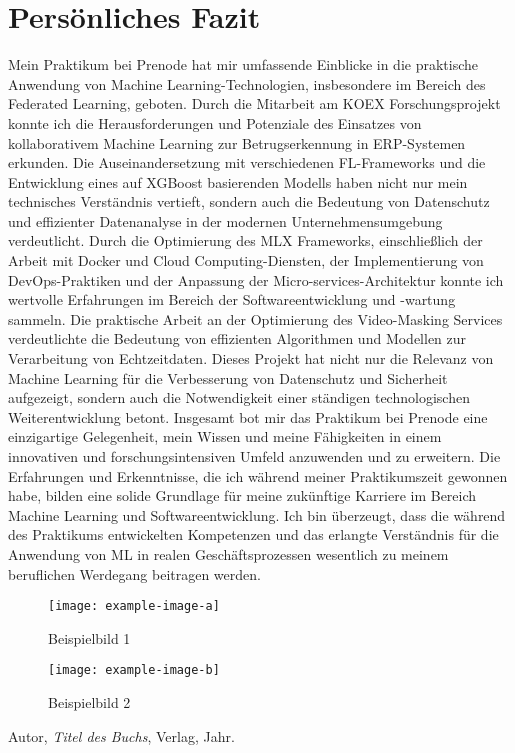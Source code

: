 \documentclass[11pt]{article}
\begin{document}
\section{Persönliches Fazit}
Mein Praktikum bei Prenode hat mir umfassende Einblicke in die praktische Anwendung von Machine Learning-Technologien, insbesondere im Bereich des Federated Learning, geboten. Durch die Mitarbeit am KOEX Forschungsprojekt konnte ich die Herausforderungen und Potenziale des Einsatzes von kollaborativem Machine Learning zur Betrugserkennung in ERP-Systemen erkunden. Die Auseinandersetzung mit verschiedenen FL-Frameworks und die Entwicklung eines auf XGBoost basierenden Modells haben nicht nur mein technisches Verständnis vertieft, sondern auch die Bedeutung von Datenschutz und effizienter Datenanalyse in der modernen Unternehmensumgebung verdeutlicht.
\newline
Durch die Optimierung des MLX Frameworks, einschließlich der Arbeit mit Docker und Cloud Computing-Diensten, der Implementierung von DevOps-Praktiken und der Anpassung der Micro-services-Architektur konnte ich wertvolle Erfahrungen im Bereich der Softwareentwicklung und -wartung sammeln. Die praktische Arbeit an der Optimierung des Video-Masking Services verdeutlichte die Bedeutung von effizienten Algorithmen und Modellen zur Verarbeitung von Echtzeitdaten. Dieses Projekt hat nicht nur die Relevanz von Machine Learning für die Verbesserung von Datenschutz und Sicherheit aufgezeigt, sondern auch die Notwendigkeit einer ständigen technologischen Weiterentwicklung betont.
Insgesamt bot mir das Praktikum bei Prenode eine einzigartige Gelegenheit, mein Wissen und meine Fähigkeiten in einem innovativen und forschungsintensiven Umfeld anzuwenden und zu erweitern. Die Erfahrungen und Erkenntnisse, die ich während meiner Praktikumszeit gewonnen habe, bilden eine solide Grundlage für meine zukünftige Karriere im Bereich Machine Learning und Softwareentwicklung. Ich bin überzeugt, dass die während des Praktikums entwickelten Kompetenzen und das erlangte Verständnis für die Anwendung von ML in realen Geschäftsprozessen wesentlich zu meinem beruflichen Werdegang beitragen werden.


\listoffigures
\newpage

\begin{figure}[h]
\centering
\texttt{[image: example-image-a]}
\caption{Beispielbild 1}
\end{figure}


\begin{figure}[h]
\centering
\texttt{[image: example-image-b]}
\caption{Beispielbild 2}
\end{figure}





\begin{thebibliography}{9}
 Autor, \emph{Titel des Buchs}, Verlag, Jahr.
\end{thebibliography}
\end{document}
